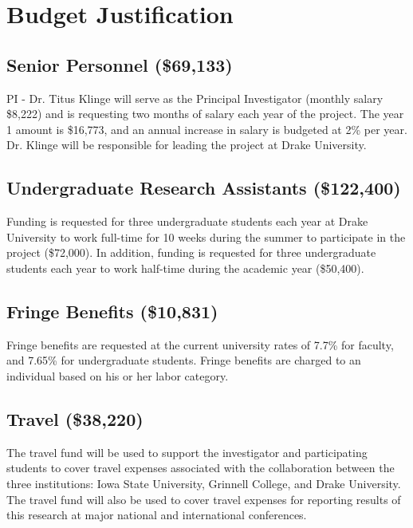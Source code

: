 \documentclass[11pt]{article}
\begin{document}



\section*{Budget Justification}

	\subsection*{Senior Personnel (\$69,133)}
	PI - Dr. Titus Klinge will serve as the Principal Investigator (monthly salary \$8,222) and is requesting two months of salary each year of the project.  The year 1 amount is \$16,773, and an annual increase in salary is budgeted at 2\% per year.  Dr. Klinge will be responsible for leading the project at Drake University.
	
	\subsection*{Undergraduate Research Assistants (\$122,400)}
	Funding is requested for three undergraduate students each year at Drake University to work full-time for 10 weeks during the summer to participate in the project (\$72,000). In addition, funding is requested for three undergraduate students each year to work half-time during the academic year (\$50,400).

	\subsection*{Fringe Benefits (\$10,831)}
	Fringe benefits are requested at the current university rates of 7.7\% for faculty, and 7.65\% for undergraduate students.  Fringe benefits are charged to an individual based on his or her labor category.
	
	\subsection*{Travel (\$38,220)}
	The travel fund will be used to support the investigator and participating students to cover travel expenses associated with the collaboration between the three institutions:  Iowa State University, Grinnell College, and Drake University.  The travel fund will also be used to cover travel expenses for reporting results of this research at major national and international conferences.
\end{document}
